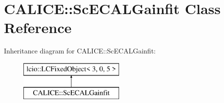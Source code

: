 \section{C\-A\-L\-I\-C\-E\-:\-:Sc\-E\-C\-A\-L\-Gainfit Class Reference}
\label{classCALICE_1_1ScECALGainfit}
Inheritance diagram for C\-A\-L\-I\-C\-E\-:\-:Sc\-E\-C\-A\-L\-Gainfit\-:\begin{figure}[H]
\begin{center}
\leavevmode
\includegraphics[height=2.000000cm]{classCALICE_1_1ScECALGainfit}
\end{center}
\end{figure}
